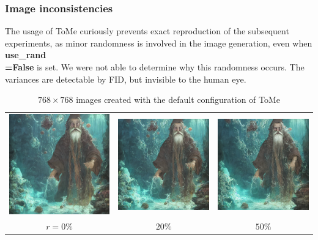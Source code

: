 \subsubsection*{Image inconsistencies}
The usage of ToMe curiously prevents exact reproduction of the subsequent experiments, as minor randomness is involved in the image generation, even when \textbf{use\_rand\\=False} is set. We were not able to determine why this randomness occurs. The variances are detectable by FID, but invisible to the human eye.

\begin{table}[!htb]
\centering
\begin{tabular}{c c c}
    \includegraphics[width=0.3\linewidth]{static/sample_imgs/secondary/wizard_0.png} & \includegraphics[width=0.3\linewidth]{static/sample_imgs/secondary/wizard_20.png} &
    \includegraphics[width=0.3\linewidth]{static/sample_imgs/secondary/wizard_50.png}\\
    \(r=0\%\) & \(20\%\) & \(50\%\) \\
\end{tabular}
\caption{$768 \times 768$ images created with the default configuration of ToMe}
\end{table}
